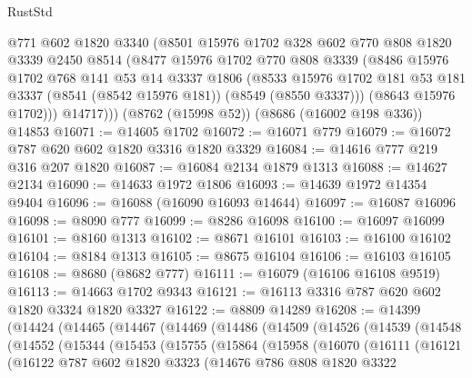\begin{lexlean}{RustStd}
\begin{coremodule}
        @771
        @602
        @1820
        @3340
        (@8501
          @15976
          @1702
          @328
          @602
          @770
          @808
          @1820
          @3339
          @2450
          @8514
          (@8477
            @15976
            @1702
            @770
            @808
            @3339
            (@8486
              @15976
              @1702
              @768
              @141
              @53
              @14
              @3337
              @1806
              (@8533
                @15976
                @1702
                @181
                @53
                @181
                @3337
                (@8541 (@8542 @15976 @181))
                (@8549 (@8550 @3337)))
              (@8643 @15976 @1702)))
          @14717)))
    (@8762 (@15998 @52))
    (@8686 (@16002 @198 @336))
    @14853
@16071 := @14605 @1702
@16072 := @16071 @779
@16079 := @16072 @787 @620 @602 @1820 @3316 @1820 @3329
@16084 := @14616 @777 @219 @316 @207 @1820
@16087 := @16084 @2134 @1879 @1313
@16088 := @14627 @2134
@16090 := @14633 @1972 @1806
@16093 := @14639 @1972 @14354 @9404
@16096 := @16088 (@16090 @16093 @14644)
@16097 := @16087 @16096
@16098 := @8090 @777
@16099 := @8286 @16098
@16100 := @16097 @16099
@16101 := @8160 @1313
@16102 := @8671 @16101
@16103 := @16100 @16102
@16104 := @8184 @1313
@16105 := @8675 @16104
@16106 := @16103 @16105
@16108 := @8680 (@8682 @777)
@16111 := @16079 (@16106 @16108 @9519)
@16113 := @14663 @1702 @9343
@16121 := @16113 @3316 @787 @620 @602 @1820 @3324 @1820 @3327
@16122 := @8809 @14289
@16208 := @14399
    (@14424
      (@14465
        (@14467
          (@14469
            (@14486
              (@14509
                (@14526
                  (@14539
                    (@14548
                      (@14552
                        (@15344
                          (@15453
                            (@15755
                              (@15864
                                (@15958
                                  (@16070
                                    (@16111
                                      (@16121
                                        (@16122
                                          @787
                                          @602
                                          @1820
                                          @3323
                                          (@14676
                                            @786
                                            @808
                                            @1820
                                            @3322

\end{coremodule}
\end{lexlean}
